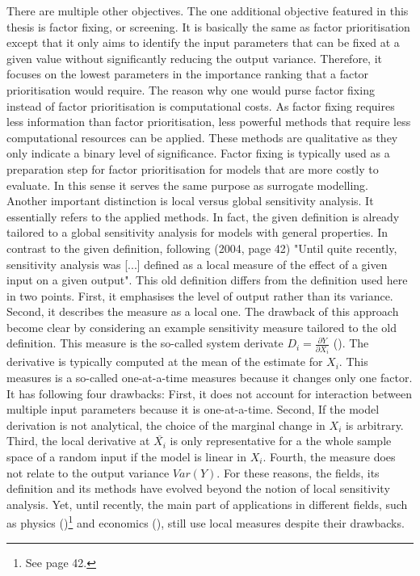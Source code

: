 \documentclass[a4paper,12pt]{article}
\begin{document}
\noindent
There are multiple other objectives. The one additional objective featured in this thesis is factor fixing, or screening. It is basically the same as factor prioritisation except that it only aims to identify the input parameters that can be fixed at a given value without significantly reducing the output variance. Therefore, it focuses on the lowest parameters in the importance ranking that a factor prioritisation would require. The reason why one would purse factor fixing instead of factor prioritisation is computational costs. As factor fixing requires less information than factor prioritisation, less powerful methods that require less computational resources can be applied. These methods are qualitative as they only indicate a binary level of significance. Factor fixing is typically used as a preparation step for factor prioritisation for models that are more costly to evaluate. In this sense it serves the same purpose as surrogate modelling.\\

\noindent
Another important distinction is local versus global sensitivity analysis. It essentially refers to the applied methods. In fact, the given definition is already tailored to a global sensitivity analysis for models with general properties. In contrast to the given definition, following \citeauthor{Saltelli.2004} (2004, page 42) "Until quite recently, sensitivity analysis was [...] defined as a local measure of the effect of a given input on a given output". This old definition differs from the definition used here in two points. First, it emphasises the level of output rather than its variance. Second, it describes the measure as a local one. The drawback of this approach become clear by considering an example sensitivity measure tailored to the old definition. This measure is the so-called system derivate $D_i = \frac{\partial Y}{\partial X_i}$ (\cite{rabitz1989systems}). The derivative is typically computed at the mean of the estimate for $X_i$. This measures is a so-called one-at-a-time measures because it changes only one factor. It has following four drawbacks: First, it does not account for interaction between multiple input parameters because it is one-at-a-time. Second, If the model derivation is not analytical, the choice of the marginal change in $X_i$ is arbitrary. Third, the local derivative at $\overline{X_i}$ is only representative for a the whole sample space of a random input if the model is linear in $X_i$. Fourth, the measure does not relate to the output variance $Var(Y)$. For these reasons, the fields, its definition and its methods have evolved beyond the notion of local sensitivity analysis. Yet, until recently, the main part of applications in different fields, such as physics (\cite{Saltelli.2004})\footnote{See page 42.} and economics (\cite{Harenberg.2019}), still use local measures despite their drawbacks.
\end{document}
